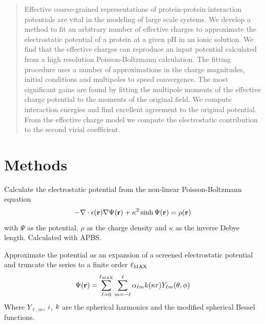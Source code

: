 \documentclass[landscape]{sciposter}
\newcommand{\eqnote}[1]{{\scriptsize#1}}
\begin{document}
\begin{multicols}{3}

\begin{abstract}
Effective coarse-grained representations of protein-protein interaction potentials are vital in the modeling of large scale systems.
We develop a method to fit an arbitrary number of effective charges to approximate the electrostatic potential of a protein at a given pH in an ionic solution.
We find that the effective charges can reproduce an input potential calculated from a high resolution Poisson-Boltzmann calculation. 
The fitting procedure uses a number of approximations in the charge magnitudes, initial conditions and multipoles to speed convergence.
The most significant gains are found by fitting the multipole moments of the effective charge potential to the moments of the original field.
We compute interaction energies and find excellent agreement to the original potential.
From the effective charge model we compute the electrostatic contribution to the second virial coefficient.
\end{abstract}

\columnbreak

\section*{Methods}
%
Calculate the electrostatic potential from the non-linear Poisson-Boltzmann equation
\begin{equation}
  \label{eq:poisson_boltzmann}
  -\nabla \cdot \epsilon( \mathbf{r} ) \nabla \Psi (\mathbf{r}) + 
  \kappa^2 \sinh \Psi (\mathbf{r}) 
  = \rho(\mathbf{r})
\end{equation}
\eqnote{with $\Psi$ as the potential, $\rho$ as the charge density and $\kappa$ as the inverse Debye length. Calculated with APBS.}
\vspace{.1em}

Approximate the potential as an expansion of a screened electrostatic potential and truncate the series to a finite order $\ell_{\text{MAX}}$
\begin{equation}
  \label{eq:yukawa_coeff}
  \Psi( \mathbf{r} ) = 
  \sum_{\ell=0}^{\ell_{\text{MAX}}} \sum_{m=-\ell}^{\ell}
  \alpha_{\ell m} k(\kappa r) Y_{\ell m} (\theta, \phi)
\end{equation}
\eqnote{Where $Y_{\ell,m}$, $i$, $k$ are the spherical harmonics and the modified spherical Bessel functions.}
\vspace{.1em}


\end{multicols}
\end{document}
